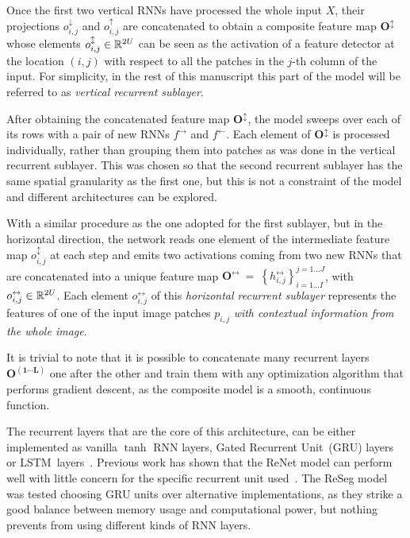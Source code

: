 Once the first two vertical RNNs have processed the whole input $X$, their
projections $o^{\downarrow}_{i,j}$ and $o^{\uparrow}_{i,j}$ are concatenated to
obtain a composite feature map $\mathbf{O^{\updownarrow}}$ whose elements
$o^{\updownarrow}_{i,j} \in \mathbb{R}^{2U}$ can be seen as the activation of a
feature detector at the location $(i,j)$ with respect to all the patches in the
$j$-th column of the input. For simplicity, in the rest of this manuscript
this part of the model will be referred to as \emph{vertical recurrent
sublayer}.

After obtaining the concatenated feature map $\mathbf{O^{\updownarrow}}$, the
model sweeps over each of its rows with a pair of new RNNs $f^{\rightarrow}$
and $f^{\leftarrow}$. Each element of $\mathbf{O^{\updownarrow}}$ is processed
individually, rather than grouping them into patches as was done in the
vertical recurrent sublayer. This was chosen so that the second recurrent
sublayer has the same spatial granularity as the first one, but this is not a
constraint of the model and different architectures can be explored.

With a similar procedure as the one adopted for the first sublayer, but in the
horizontal direction, the network reads one element of the intermediate feature
map $o^\updownarrow_{i,j}$ at each step and emits two activations coming from
two new RNNs that are concatenated into a unique feature map
$\mathbf{O^\leftrightarrow}~=~\left\{ h^\leftrightarrow_{i,j} \right\}
_{i=1\dots I}^{j=1\dots J}$, with $o^\leftrightarrow_{i,j} \in
\mathbb{R}^{2U}$. Each element $o^\leftrightarrow_{i,j}$ of this \emph{horizontal
recurrent sublayer} represents the features of one of the input image patches
$p_{i,j}$ \emph{with contextual information from the whole image}.

It is trivial to note that it is possible to concatenate many recurrent layers
$\mathbf{O^{(1 \cdots L)}}$ one after the other and train them with any
optimization algorithm that performs gradient descent, as the composite model
is a smooth, continuous function.

The recurrent layers that are the core of this architecture, can be either
implemented as vanilla $\tanh$ RNN layers, Gated Recurrent Unit~(GRU)
layers~\citep{Cho2014} or LSTM~layers~\citep{Hochreiter+Schmidhuber-1997}.
Previous work has shown that the ReNet model can perform well with little
concern for the specific recurrent unit used~\citep{visin2015renet}. The ReSeg
model was tested choosing GRU units over alternative implementations, as
they strike a good balance between memory usage and computational power, but
nothing prevents from using different kinds of RNN layers.

